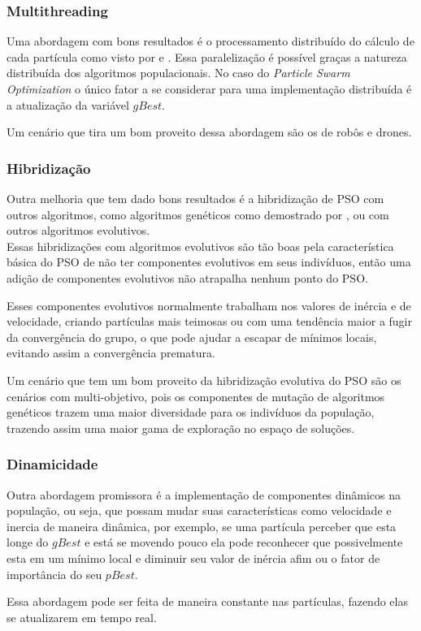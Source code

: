         \subsubsection{Multithreading}
            Uma abordagem com bons resultados é o processamento distribuído do cálculo de cada partícula como visto por \cite{Thongkrairat2019} e \cite{Kim2011}. Essa paralelização é possível graças a natureza distribuída dos algoritmos populacionais. No caso do \textit{Particle Swarm Optimization} o único fator a se considerar para uma implementação distribuída é a atualização da variável $gBest$.\hfill\vspace{\onelineskip}
            
            Um cenário que tira um bom proveito dessa abordagem são os de robôs e drones.            

        \subsubsection{Hibridização}
            Outra melhoria que tem dado bons resultados é a hibridização de PSO com outros algoritmos, como algoritmos genéticos como demostrado por \cite{carvalho2014}, ou com outros algoritmos evolutivos.\hfill
            \\
            Essas hibridizações com algoritmos evolutivos são tão boas pela característica básica do PSO de não ter componentes evolutivos em seus indivíduos, então uma adição de componentes evolutivos não atrapalha nenhum ponto do PSO.\hfill\vspace{\onelineskip}
            
            Esses componentes evolutivos normalmente trabalham nos valores de inércia e de velocidade, criando partículas mais teimosas ou com uma tendência maior a fugir da convergência do grupo, o que pode ajudar a escapar de mínimos locais, evitando assim a convergência prematura.\hfill\vspace{\onelineskip}
            
            Um cenário que tem um bom proveito da hibridização evolutiva do PSO são os cenários com multi-objetivo, pois os componentes de mutação de algoritmos genéticos trazem uma maior diversidade para os indivíduos da população, trazendo assim uma maior gama de exploração no espaço de soluções.

        \subsubsection{Dinamicidade}
            Outra abordagem promissora é a implementação de componentes dinâmicos na população, ou seja, que possam mudar suas características como velocidade e inercia de maneira dinâmica, por exemplo, se uma partícula perceber que esta longe do $gBest$ e está se movendo pouco ela pode reconhecer que possivelmente esta em um mínimo local e diminuir seu valor de inércia afim ou o fator de importância do seu $pBest$.\hfill\vspace{\onelineskip}
            
            Essa abordagem pode ser feita de maneira constante nas partículas, fazendo elas se atualizarem em tempo real.

